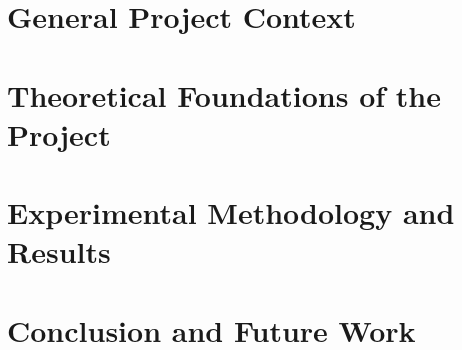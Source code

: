 \documentclass[english, a4paper, 12pt, twoside]{insea}
\begin{document}
\chapter{General Project Context}
    
\clearpage

\chapter{Theoretical Foundations of the Project}
    
    
    
\clearpage

\chapter{Experimental Methodology and Results}
    
    
    
\clearpage

\chapter*{Conclusion and Future Work}
    \label{chap:conclusion}
    
\clearpage

\newpage
\renewcommand\bibname{References} %

{ %
}


\newpage
\renewcommand{\appendixpagename}{Annexe} %
\renewcommand{\appendixtocname}{Annexe} %
\addappheadtotoc


%     


%     
\end{document}
